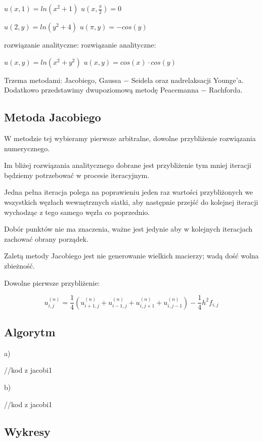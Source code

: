 $u(x,1) = ln(x^2 + 1)$ \hspace{3.28cm} $u(x,\frac{\pi}{2}) = 0$

$u(2,y) = ln(y^2 + 4)$ \hspace{3.3cm} $u(\pi,y) = -cos(y)$

rozwiązanie analityczne: \hspace{2.6cm} rozwiązanie analityczne:

$u(x,y) = ln(x^2 + y^2)$ \hspace{3.1cm} $u(x,y) = cos(x)\cdot cos(y)$

\vspace{0.5cm}

Trzema metodami: Jacobiego, Gaussa $-$ Seidela oraz nadrelaksacji Younge'a. Dodatkowo przedstawimy dwupoziomową metodę Peacemanna $-$ Rachforda.

\subsection{Metoda Jacobiego}

W metodzie tej wybieramy pierwsze arbitralne, dowolne przybliżenie rozwiązania numerycznego.

Im bliżej rozwiązania analitycznego dobrane jest przybliżenie tym mniej iteracji będziemy potrzebować w procesie iteracyjnym.

Jedna pełna iteracja polega na poprawieniu jeden raz wartości przybliżonych we wszystkich węzłach wewnętrznych siatki, aby następnie przejść do kolejnej iteracji wychodząc z tego samego węzła co poprzednio.

Dobór punktów nie ma znaczenia, ważne jest jedynie aby w kolejnych iteracjach zachować obrany porządek.

Zaletą metody Jacobiego jest nie generowanie wielkich macierzy; wadą dość wolna zbieżność.

Dowolne pierwsze przybliżenie:

$$u_{i,j}^{(n)} = \frac{1}{4}(u_{i+1,j}^{(n)} + u_{i-1,j}^{(n)} + u_{i,j+1}^{(n)} + u_{i,j-1}^{(n)}) - \frac{1}{4}h^2f_{i,j}$$

\subsection{Algorytm}

a)

//kod z jacobi1

b)

//kod z jacobi1

\subsection{Wykresy}

